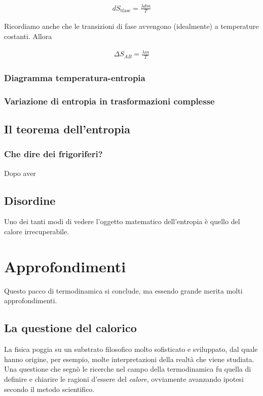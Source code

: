 \begin{align}
    dS_\text{tfase} = \frac{\lambda dm}{T}
\end{align}

\noindent Ricordiamo anche che le transizioni di fase avvengono
(idealmente) a temperature costanti. Allora

\begin{align}
    \Delta S_{AB} = \frac{\lambda m}{T}
\end{align}

\subsubsection*{Diagramma temperatura-entropia}

\subsubsection*{Variazione di entropia in trasformazioni complesse}



\subsection{Il teorema dell'entropia}


\subsubsection{Che dire dei frigoriferi?}
Dopo aver 


\subsection{Disordine}
Uno dei tanti modi di vedere l'oggetto matematico dell'entropia
è quello del calore irrecuperabile.


\section{Approfondimenti}
Questo pacco di termodinamica si conclude, ma essendo grande
merita molti approfondimenti.

\subsection{La questione del calorico}
La fisica poggia su un substrato filosofico molto sofisticato e
sviluppato, dal quale hanno origine, per esempio, molte interpretazioni
della realtà che viene studiata. Una questione che segnò le ricerche
nel campo della termodinamica fu quella di definire e chiarire le
ragioni d'essere del \textit{calore}, ovviamente avanzando ipotesi
secondo il metodo scientifico.

